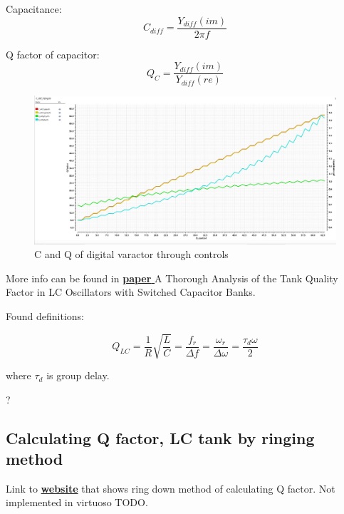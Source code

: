 Capacitance:
\begin{equation}
	C_{diff} = \dfrac{Y_{diff} (im)}{2\pi f}
\end{equation}

Q factor of capacitor:
\begin{equation}
	Q_C = \dfrac{Y_{diff} (im)}{ Y_{diff} (re)}
\end{equation}

\begin{figure}[h!]
	\includegraphics[width=\linewidth]{Figures/Dvaractor.png}
	\caption{C and Q of digital varactor through controls}
	\label{fig:dvaracator}
\end{figure}

More info can be found in  \href{https://ieeexplore.ieee.org/abstract/document/5537949}{\textbf{paper }} A Thorough Analysis of the Tank Quality Factor in LC Oscillators with Switched Capacitor Banks.

Found definitions:

\begin{equation}
	Q_{LC} = \dfrac{1}{R}\sqrt{\dfrac{L}{C}} = \frac{f_r}{\Delta f} = \frac{\omega _r}{\Delta \omega} = \dfrac{\tau _d \omega}{2}
\end{equation}

where $\tau _d$ is group delay.

\begin{question}
	?
\end{question}

\subsection{Calculating Q factor‚ LC tank by ringing method}

Link to \href{https://www.giangrandi.ch/electronics/ringdownq/ringdownq.shtml}{\textbf{website}} that shows ring down method of calculating Q factor. Not implemented in virtuoso TODO.


